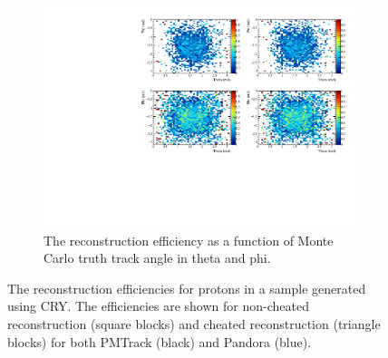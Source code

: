 \begin{figure}[h!]
\begin{subfigure}{.45\textwidth}
        \centering
        \includegraphics[width=\textwidth]{Effic_ProtonEnrich_500V_Proton_PhiTheta}
        \caption{The reconstruction efficiency as a function of Monte Carlo truth track angle in theta and phi.}
        \label{fig:Prot_Effic_PhiTheta}
  \end{subfigure}
  \caption[The reconstruction efficiencies for protons in a sample generated using CRY.]
          {The reconstruction efficiencies for protons in a sample generated using CRY. The efficiencies are shown for non-cheated reconstruction (square blocks) and cheated reconstruction (triangle blocks) for both PMTrack (black) and Pandora (blue).}
  \label{fig:Prot_Effic}
\end{figure}

